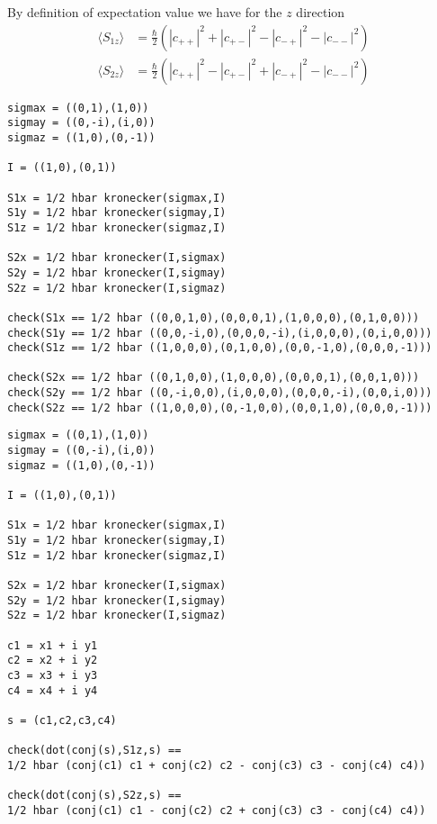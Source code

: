 By definition of expectation value we have for the $z$ direction
\begin{align*}
\langle S_{1z}\rangle&=\tfrac{\hbar}{2}\left(|c_{++}|^2+|c_{+-}|^2-|c_{-+}|^2-|c_{--}|^2\right)
\\
\langle S_{2z}\rangle&=\tfrac{\hbar}{2}\left(|c_{++}|^2-|c_{+-}|^2+|c_{-+}|^2-|c_{--}|^2\right)
\end{align*}

\newpage
{}

{\footnotesize\begin{verbatim}
sigmax = ((0,1),(1,0))
sigmay = ((0,-i),(i,0))
sigmaz = ((1,0),(0,-1))

I = ((1,0),(0,1))

S1x = 1/2 hbar kronecker(sigmax,I)
S1y = 1/2 hbar kronecker(sigmay,I)
S1z = 1/2 hbar kronecker(sigmaz,I)

S2x = 1/2 hbar kronecker(I,sigmax)
S2y = 1/2 hbar kronecker(I,sigmay)
S2z = 1/2 hbar kronecker(I,sigmaz)

check(S1x == 1/2 hbar ((0,0,1,0),(0,0,0,1),(1,0,0,0),(0,1,0,0)))
check(S1y == 1/2 hbar ((0,0,-i,0),(0,0,0,-i),(i,0,0,0),(0,i,0,0)))
check(S1z == 1/2 hbar ((1,0,0,0),(0,1,0,0),(0,0,-1,0),(0,0,0,-1)))

check(S2x == 1/2 hbar ((0,1,0,0),(1,0,0,0),(0,0,0,1),(0,0,1,0)))
check(S2y == 1/2 hbar ((0,-i,0,0),(i,0,0,0),(0,0,0,-i),(0,0,i,0)))
check(S2z == 1/2 hbar ((1,0,0,0),(0,-1,0,0),(0,0,1,0),(0,0,0,-1)))
\end{verbatim}}

\newpage
{}

{\footnotesize\begin{verbatim}
sigmax = ((0,1),(1,0))
sigmay = ((0,-i),(i,0))
sigmaz = ((1,0),(0,-1))

I = ((1,0),(0,1))

S1x = 1/2 hbar kronecker(sigmax,I)
S1y = 1/2 hbar kronecker(sigmay,I)
S1z = 1/2 hbar kronecker(sigmaz,I)

S2x = 1/2 hbar kronecker(I,sigmax)
S2y = 1/2 hbar kronecker(I,sigmay)
S2z = 1/2 hbar kronecker(I,sigmaz)

c1 = x1 + i y1
c2 = x2 + i y2
c3 = x3 + i y3
c4 = x4 + i y4

s = (c1,c2,c3,c4)

check(dot(conj(s),S1z,s) ==
1/2 hbar (conj(c1) c1 + conj(c2) c2 - conj(c3) c3 - conj(c4) c4))

check(dot(conj(s),S2z,s) ==
1/2 hbar (conj(c1) c1 - conj(c2) c2 + conj(c3) c3 - conj(c4) c4))
\end{verbatim}}


